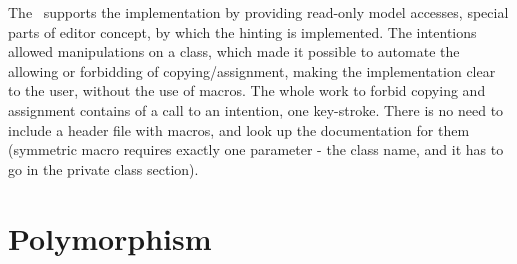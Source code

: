 The \jbmps\ supports the implementation by providing read-only model accesses, special parts of editor concept, 
by which the hinting is implemented. The intentions allowed manipulations on a class, which made it possible to 
automate the allowing or forbidding of copying/assignment, making the implementation clear to the user, without the 
use of macros. The whole work to forbid copying and assignment contains of a call to an intention, one key-stroke.
There is no need to include a header file with macros, and look up the documentation for them (symmetric macro requires
exactly one parameter - the class name, and it has to go in the private class section).












\section{Polymorphism}



